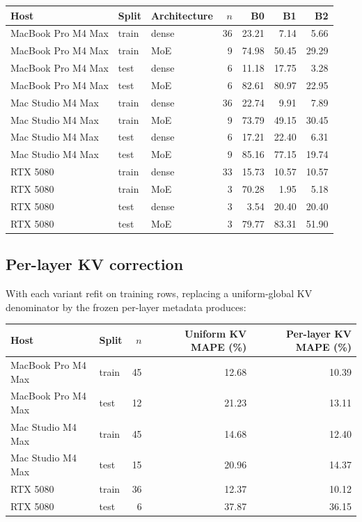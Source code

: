 \documentclass[10pt]{article}
\begin{document}
\begin{center}
\small
\begin{tabular}{lllrrrr}
\toprule
Host & Split & Architecture & $n$ & B0 & B1 & B2\\
\midrule
MacBook Pro M4 Max & train & dense & 36 & 23.21 & 7.14 & 5.66 \\
MacBook Pro M4 Max & train & MoE & 9 & 74.98 & 50.45 & 29.29 \\
MacBook Pro M4 Max & test & dense & 6 & 11.18 & 17.75 & 3.28 \\
MacBook Pro M4 Max & test & MoE & 6 & 82.61 & 80.97 & 22.95 \\
Mac Studio M4 Max & train & dense & 36 & 22.74 & 9.91 & 7.89 \\
Mac Studio M4 Max & train & MoE & 9 & 73.79 & 49.15 & 30.45 \\
Mac Studio M4 Max & test & dense & 6 & 17.21 & 22.40 & 6.31 \\
Mac Studio M4 Max & test & MoE & 9 & 85.16 & 77.15 & 19.74 \\
RTX 5080 & train & dense & 33 & 15.73 & 10.57 & 10.57 \\
RTX 5080 & train & MoE & 3 & 70.28 & 1.95 & 5.18 \\
RTX 5080 & test & dense & 3 & 3.54 & 20.40 & 20.40 \\
RTX 5080 & test & MoE & 3 & 79.77 & 83.31 & 51.90 \\
\bottomrule
\end{tabular}
\end{center}
\subsection{Per-layer KV correction}
With each variant refit on training rows, replacing a uniform-global KV denominator by the frozen per-layer metadata produces:
\begin{center}
\small
\begin{tabular}{llrrr}
\toprule
Host & Split & $n$ & Uniform KV MAPE (\%) & Per-layer KV MAPE (\%)\\
\midrule
MacBook Pro M4 Max & train & 45 & 12.68 & 10.39 \\
MacBook Pro M4 Max & test & 12 & 21.23 & 13.11 \\
Mac Studio M4 Max & train & 45 & 14.68 & 12.40 \\
Mac Studio M4 Max & test & 15 & 20.96 & 14.37 \\
RTX 5080 & train & 36 & 12.37 & 10.12 \\
RTX 5080 & test & 6 & 37.87 & 36.15 \\
\bottomrule
\end{tabular}
\end{center}
\end{document}
